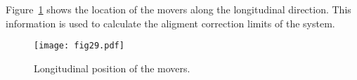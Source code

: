 Figure~\ref{f:moverlong} shows the location of the movers along the longitudinal direction. This information is used to calculate the aligment correction limits of the system.\par
\begin{figure}[ht]
\centering
\texttt{[image: fig29.pdf]}\caption{Longitudinal position of the movers.}\label{f:moverlong}
\end{figure}
